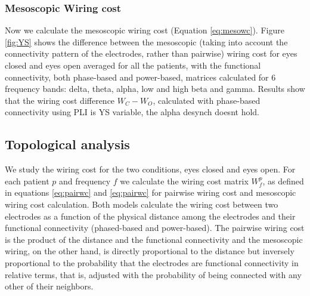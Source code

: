 \documentclass[11pt, onecolumn]{article}
\begin{document}

\subsubsection{Mesoscopic Wiring cost} %
Now we calculate the mesoscopic wiring cost (Equation \ref{eq:mesowc}). Figure \ref{fig:YS} shows the difference between the mesoscopic (taking into account the connectivity pattern of the electrodes, rather than pairwise) wiring cost for eyes closed and eyes open averaged for all the patients, with the functional connectivity, both phase-based and power-based, matrices calculated for 6 frequency bands: delta, theta, alpha, low and high beta and gamma. 
Results show that the wiring cost difference $W_C - W_O$, calculated with phase-based connectivity using PLI is YS variable, the alpha desynch doesnt hold.
 
\subsection{Topological analysis}
%
We study the wiring cost for the two conditions, eyes closed and eyes open. For each  patient $p$ and frequency $f$ we calculate the wiring cost matrix $W^p_{f}$, as defined in equations \ref{eq:pairwc} and \ref{eq:pairwc} for pairwise wiring cost and mesoscopic wiring cost calculation.
Both models calculate the wiring cost between two electrodes as a function of the physical distance among the electrodes and their functional connectivity (phased-based and power-based). The pairwise wiring cost is the product of the distance and the functional connectivity and the mesoscopic wiring, on the other hand, is directly proportional to the distance but inversely proportional to the probability that the electrodes are functional connectivity in relative terms, that is, adjusted with the probability of being connected with any other of their neighbors.
\end{document}

